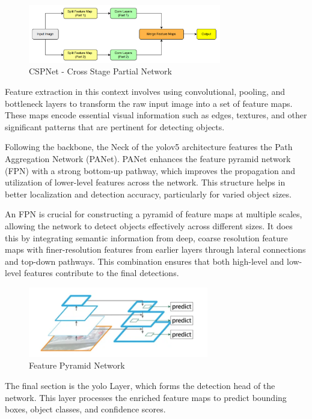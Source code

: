 \begin{figure}[h]
    \centering 
    \includegraphics[width=0.75\textwidth]{figs/spnet.png} 
    \caption{CSPNet - Cross Stage Partial Network}
    \label{fig:cspnet}
\end{figure}

Feature extraction in this context involves using convolutional, pooling, and bottleneck layers to 
transform the raw input image into a set of feature maps. These maps encode essential visual information 
such as edges, textures, and other significant patterns that are pertinent for detecting objects.

Following the backbone, the Neck of the \ac{yolo}v5 architecture features the Path Aggregation Network (PANet). PANet 
enhances the feature pyramid network (FPN) with a strong bottom-up pathway, which improves the propagation and 
utilization of lower-level features across the network. This structure helps in better localization and detection 
accuracy, particularly for varied object sizes.

An FPN is crucial for constructing a pyramid of feature maps at multiple scales, allowing the network to detect 
objects effectively across different sizes. It does this by integrating semantic information from deep, coarse 
resolution feature maps with finer-resolution features from earlier layers through lateral connections and top-down 
pathways. This combination ensures that both high-level and low-level features contribute to the final detections.

\begin{figure}[h]
    \centering 
    \includegraphics[width=0.7\textwidth]{figs/fpn.png} 
    \caption{Feature Pyramid Network}
    \label{fig:fpn}
\end{figure}

The final section is the \ac{yolo} Layer, which forms the detection head of the network. This layer processes the 
enriched feature maps to predict bounding boxes, object classes, and confidence scores.

